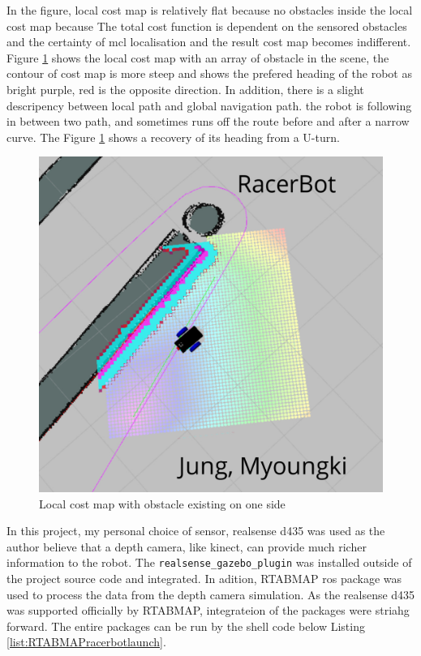\documentclass[10pt,journal,compsoc]{IEEEtran}
\begin{document}
In the figure, local cost map is relatively flat because no obstacles inside the local cost map because The total cost function is dependent on the sensored obstacles and the certainty of mcl localisation and the result cost map becomes indifferent. 
Figure \ref{fig:localcostmap} shows the local cost map with an array of obstacle in the scene, the contour of cost map is more steep and shows the prefered heading of the robot as bright purple, red is the opposite direction. In addition, there is a slight descripency between local path and global navigation path. the robot is following in between two path, and sometimes runs off the route before and after a narrow curve. The Figure \ref{fig:localcostmap} shows a recovery of its heading from a U-turn.
\begin{figure}[thpb]
      \centering
      \includegraphics[width=\linewidth]{./img/localcostmap.png}
      \caption{Local cost map with obstacle existing on one side}
      \label{fig:localcostmap}
\end{figure}
In this project, my personal choice of sensor, realsense d435 was used as the author believe that a depth camera, like kinect, can provide much richer information to the robot.
The \verb!realsense_gazebo_plugin! was installed outside of the project source code and integrated.\cite{Missri}
In adition, RTABMAP ros package was used to process the data from the depth camera simulation. As the realsense d435 was supported officially by RTABMAP, integrateion of the packages were striahg forward. 
The entire packages can be run by the shell code below Listing \ref{list:RTABMAPracerbotlaunch}.
\end{document}
